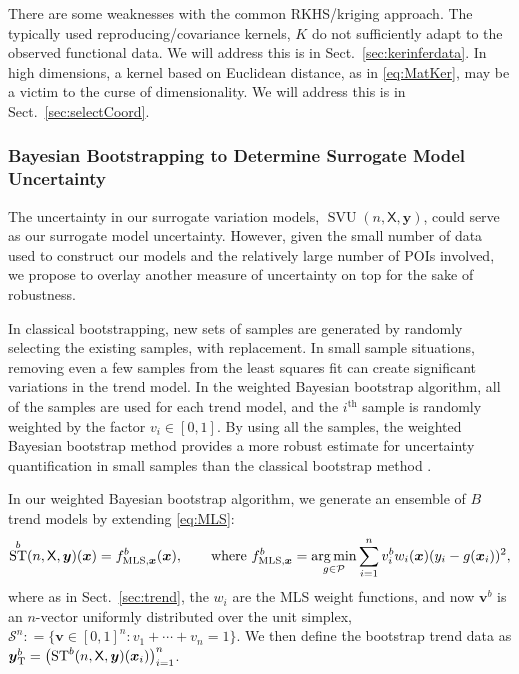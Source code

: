 \documentclass[11pt]{NSFamsart}
\DeclareMathOperator*{\argmin}{arg\,min}
\DeclareMathOperator{\STREND}{ST} %
\DeclareMathOperator{\SVARERR}{SVU} %
\newcommand{\TREND}{\textup{T}}
\newcommand{\LS}{\textup{MLS}}
\newcommand{\mX}{\mathsf{X}}
\newcommand{\bx}{{\boldsymbol{x}}}
\newcommand{\bv}{{\boldsymbol{v}}}
\newcommand{\by}{{\boldsymbol{y}}}
\newcommand{\calp}{{\mathcal{P}}}
\newcommand{\cals}{{\mathcal{S}}}
\begin{document}
There are some weaknesses with the common RKHS/kriging approach. The typically used reproducing/covariance kernels, $K$ do not sufficiently adapt to the observed functional data. We will address this is in Sect.\ \ref{sec:kerinferdata}. In high dimensions, a kernel based on Euclidean distance, as in \eqref{eq:MatKer}, may be a victim to the curse of dimensionality. We will address this is in Sect.\ \ref{sec:selectCoord}.


\subsubsection{Bayesian Bootstrapping to Determine Surrogate Model Uncertainty} \label{sec:BayesianBootUncertainty}
The uncertainty in our surrogate variation models, $\SVARERR(n,\mX,\by)$, could serve as our surrogate model uncertainty. However, given the small number of data used to construct our models and the relatively large number of POIs involved, we propose to overlay another measure of uncertainty on top for the sake of robustness. 

In classical bootstrapping, new sets of samples are generated by randomly selecting the existing samples, with replacement. 
In small sample situations, removing even a few samples from the least squares fit can create significant variations in the trend model. In the weighted Bayesian bootstrap algorithm, all of the samples are used for each trend model, and the $i^{\text{th}}$ sample is randomly weighted by the factor $v_i \in [0,1]$. By using all the samples, the weighted Bayesian bootstrap method provides a more robust estimate for uncertainty quantification in small samples than the classical bootstrap method \cite{rubin1981bayesian, efron1986bootstrap, efron2016computer}. 

In our weighted Bayesian bootstrap algorithm, we generate an ensemble of $B$ trend models by extending \eqref{eq:MLS}:
\begin{equation}
\STREND^b(n,\mX,\by)(\bx) = f^b_{\LS,\bx}(\bx), \qquad \text{where } f^b_{\LS,\bx} = \argmin_{g \in \calp} \sum_{i=1}^n v_i^b w_i(\bx)(y_i - g(\bx_i))^2,
\end{equation}
where as in Sect.\ \ref{sec:trend}, the $w_i$ are the MLS weight functions, and now $\bv^b$ is an $n$-vector uniformly distributed over the unit simplex, $\cals^n : = \{\bv \in [0,1]^n : v_1 + \cdots + v_n = 1\}$. We then define the bootstrap trend data as $\by^b_{\TREND} = \bigl(\STREND^b(n,\mX,\by)(\bx_i) \bigr)_{i=1}^n$. 
\end{document}

